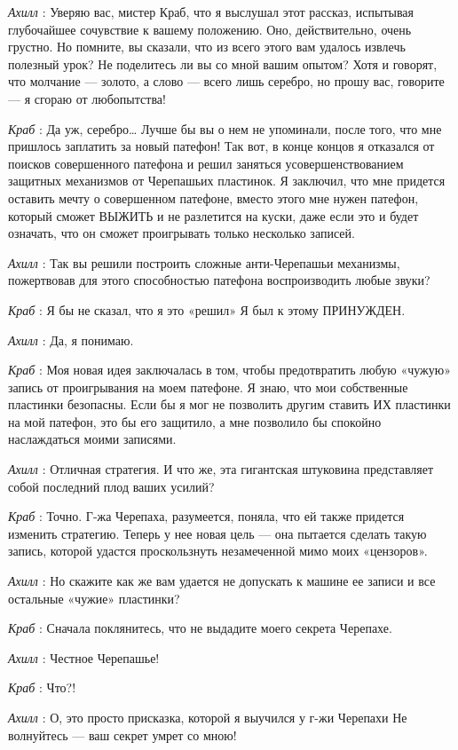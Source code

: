 \documentclass[../main.tex]{subfiles}
\begin{document}
\begin{dialogue}
\emph{Ахилл} : Уверяю вас, мистер Краб, что я выслушал этот рассказ, испытывая глубочайшее сочувствие к вашему положению. Оно, действительно, очень грустно. Но помните, вы сказали, что из всего этого вам удалось извлечь полезный урок? Не поделитесь ли вы со мной вашим опытом? Хотя и говорят, что молчание --- золото, а слово --- всего лишь серебро, но прошу вас, говорите --- я сгораю от любопытства!

\emph{Краб} : Да уж, серебро\ldots{} Лучше бы вы о нем не упоминали, после того, что мне пришлось заплатить за новый патефон! Так вот, в конце концов я отказался от поисков совершенного патефона и решил заняться усовершенствованием защитных механизмов от Черепашьих пластинок. Я заключил, что мне придется оставить мечту о совершенном патефоне, вместо этого мне нужен патефон, который сможет ВЫЖИТЬ и не разлетится на куски, даже если это и будет означать, что он сможет проигрывать только несколько записей.

\emph{Ахилл} : Так вы решили построить сложные анти-Черепашьи механизмы, пожертвовав для этого способностью патефона воспроизводить любые звуки?

\emph{Краб} : Я бы не сказал, что я это «решил» Я был к этому ПРИНУЖДЕН.

\emph{Ахилл} : Да, я понимаю.

\emph{Краб} : Моя новая идея заключалась в том, чтобы предотвратить любую «чужую» запись от проигрывания на моем патефоне. Я знаю, что мои собственные пластинки безопасны. Если бы я мог не позволить другим ставить ИХ пластинки на мой патефон, это бы его защитило, а мне позволило бы спокойно наслаждаться моими записями.

\emph{Ахилл} : Отличная стратегия. И что же, эта гигантская штуковина представляет собой последний плод ваших усилий?

\emph{Краб} : Точно. Г-жа Черепаха, разумеется, поняла, что ей также придется изменить стратегию. Теперь у нее новая цель --- она пытается сделать такую запись, которой удастся проскользнуть незамеченной мимо моих «цензоров».

\emph{Ахилл} : Но скажите как же вам удается не допускать к машине ее записи и все остальные «чужие» пластинки?

\emph{Краб} : Сначала поклянитесь, что не выдадите моего секрета Черепахе.

\emph{Ахилл} : Честное Черепашье!

\emph{Краб} : Что?!

\emph{Ахилл} : О, это просто присказка, которой я выучился у г-жи Черепахи Не волнуйтесь --- ваш секрет умрет со мною!


\end{dialogue}
\end{document}
